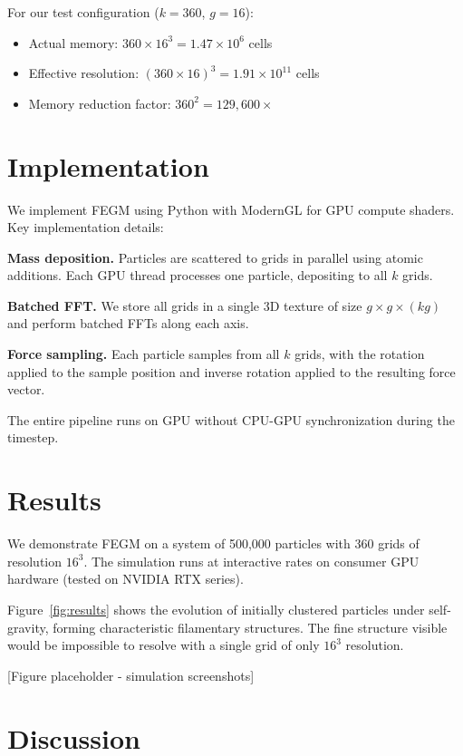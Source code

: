 \documentclass[11pt,twocolumn]{article}
\begin{document}
For our test configuration ($k=360$, $g=16$):
\begin{itemize}
    \item Actual memory: $360 \times 16^3 = 1.47 \times 10^6$ cells
    \item Effective resolution: $(360 \times 16)^3 = 1.91 \times 10^{11}$ cells
    \item Memory reduction factor: $360^2 = 129,600\times$
\end{itemize}

\section{Implementation}

We implement FEGM using Python with ModernGL for GPU compute shaders. Key implementation details:

\textbf{Mass deposition.} Particles are scattered to grids in parallel using atomic additions. Each GPU thread processes one particle, depositing to all $k$ grids.

\textbf{Batched FFT.} We store all grids in a single 3D texture of size $g \times g \times (kg)$ and perform batched FFTs along each axis.

\textbf{Force sampling.} Each particle samples from all $k$ grids, with the rotation applied to the sample position and inverse rotation applied to the resulting force vector.

The entire pipeline runs on GPU without CPU-GPU synchronization during the timestep.

\section{Results}

We demonstrate FEGM on a system of 500,000 particles with 360 grids of resolution $16^3$. The simulation runs at interactive rates on consumer GPU hardware (tested on NVIDIA RTX series).

Figure~\ref{fig:results} shows the evolution of initially clustered particles under self-gravity, forming characteristic filamentary structures. The fine structure visible would be impossible to resolve with a single grid of only $16^3$ resolution.

[Figure placeholder - simulation screenshots]

\section{Discussion}
\end{document}
